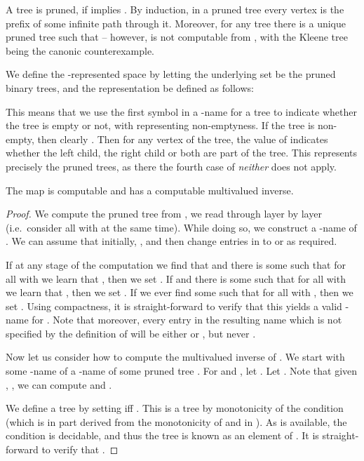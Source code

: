 \documentclass{eptcs-modified}
\begin{document}
A tree is pruned, if  implies . By induction, in a pruned tree every vertex is the prefix of some infinite path through it. Moreover, for any tree  there is a unique pruned tree  such that  -- however,  is not computable from , with the Kleene tree being the canonic counterexample.

\begin{definition}
\label{def:pruned}
We define the -represented space  by letting the underlying set be the pruned binary trees, and the  representation  be defined as follows:

\end{definition}

This means that we use the first symbol in a -name for a tree to indicate whether the tree is empty or not, with  representing non-emptyness. If the tree is non-empty, then clearly . Then for any vertex  of the tree, the value of  indicates whether the left child, the right child or both are part of the tree. This represents precisely the pruned trees, as there the fourth case of \emph{neither} does not apply.

\begin{theorem}
\label{theo:prunedtrees}
The map  is computable and has a computable multivalued inverse.
\begin{proof}
We compute the pruned tree  from , we read through  layer by layer (i.e.~consider all  with  at the same time).
 While doing so, we construct a -name  of . We can assume that initially, , and then change entries in  to  or  as required.

If at any stage of the computation we find that  and there is some  such that for all  with  we learn that , then we set . If  and there is some  such that for all  with  we learn that , then we set . If we ever find some  such that  for all  with , then we set . Using compactness, it is straight-forward to verify that this yields a valid -name for . Note that moreover, every entry in the resulting name  which is not specified by the definition of  will be either  or , but never .

Now let us consider how to compute the multivalued inverse of . We start with some -name 
of a -name 
of some pruned tree . For  and , let . Let . Note that given , ,  we can compute  and .

We define a tree  by setting  iff . This is a tree by monotonicity of the condition (which is in part derived from the monotonicity of  and  in ). As  is available, the condition is decidable, and thus the tree is known as an element of . It is straight-forward to verify that .
\end{proof}
\end{theorem}
\end{document}
